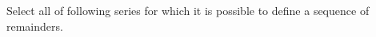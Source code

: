 \documentclass{ximera}
\author{Jim Talamo}
\begin{document}
\begin{exercise}

Select all of following series for which it is possible to define a sequence of remainders.

\begin{selectAll}
\end{selectAll}


\end{exercise}
\end{document}
